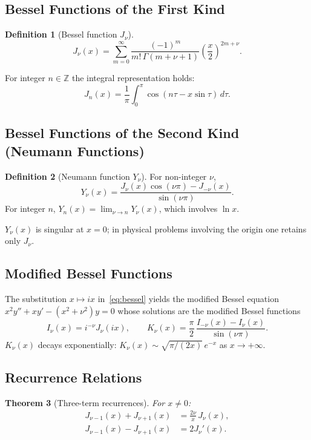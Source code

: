 \documentclass[12pt,a4paper]{amsart}
\newtheorem{theorem}{Theorem}[section]
\theoremstyle{definition}
\newtheorem{definition}[theorem]{Definition}
\begin{document}
\subsection{Bessel Functions of the First Kind}

\begin{definition}[Bessel function \(J_\nu\)]
\[
  J_\nu(x) = \sum_{m=0}^\infty \frac{(-1)^m}{m!\,\Gamma(m+\nu+1)}
  \left(\frac{x}{2}\right)^{2m+\nu}.
\]
\end{definition}

For integer \(n \in \mathbb{Z}\) the integral representation holds:
\[
  J_n(x) = \frac{1}{\pi}\int_0^\pi \cos(n\tau - x\sin\tau)\,d\tau.
\]

\subsection{Bessel Functions of the Second Kind (Neumann Functions)}

\begin{definition}[Neumann function \(Y_\nu\)]
For non-integer \(\nu\),
\[
  Y_\nu(x) = \frac{J_\nu(x)\cos(\nu\pi) - J_{-\nu}(x)}{\sin(\nu\pi)}.
\]
For integer \(n\), \(Y_n(x) = \lim_{\nu\to n} Y_\nu(x)\), which involves \(\ln x\).
\end{definition}

\(Y_\nu(x)\) is singular at \(x = 0\); in physical problems involving the origin one
retains only \(J_\nu\).

\subsection{Modified Bessel Functions}

The substitution \(x \mapsto ix\) in~\eqref{eq:bessel} yields the modified Bessel equation
\(x^2 y'' + xy' - (x^2+\nu^2)y = 0\) whose solutions are the modified Bessel functions
\[
  I_\nu(x) = i^{-\nu}J_\nu(ix), \qquad
  K_\nu(x) = \frac{\pi}{2}\,\frac{I_{-\nu}(x)-I_\nu(x)}{\sin(\nu\pi)}.
\]
\(K_\nu(x)\) decays exponentially: \(K_\nu(x) \sim \sqrt{\pi/(2x)}\,e^{-x}\) as
\(x \to +\infty\).

\subsection{Recurrence Relations}

\begin{theorem}[Three-term recurrences]\label{thm:bessel_recur}
For \(x \neq 0\):
\begin{align}
  J_{\nu-1}(x) + J_{\nu+1}(x) &= \frac{2\nu}{x}\,J_\nu(x),\label{eq:bessel_rec1}\\
  J_{\nu-1}(x) - J_{\nu+1}(x) &= 2J_\nu'(x).\label{eq:bessel_rec2}
\end{align}
\end{theorem}
\end{document}
